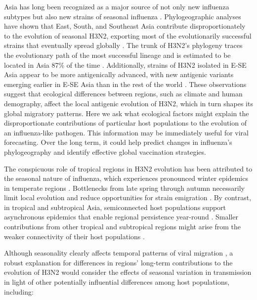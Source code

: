 \documentclass[10pt]{article}
\begin{document}
Asia has long been recognized as a major source of not only new influenza subtypes but also new strains of seasonal influenza \cite{Shortridge:1982wo, Webster:1992wl, Cox:1994ui, Cox:2000gq}. 
Phylogeographic analyses have shown that East, South, and Southeast Asia contribute disproportionately to the evolution of seasonal H3N2, exporting most of the evolutionarily successful strains that eventually spread globally \cite{Rambaut:2008ew,Russell:2008ke,Bahl:2011ep, Bedford:2010el, Bedford:2015fj}. 
The trunk of H3N2's phylogeny traces the evolutionary path of the most successful lineage and is estimated to be located in Asia 87\% of the time \cite{Bedford:2015fj}.
Additionally, strains of H3N2 isolated in E-SE Asia appear to be more antigenically advanced, with new antigenic variants emerging earlier in E-SE Asia than in the rest of the world \cite{Russell:2008ke, Bedford:2014bf}.
These observations suggest that ecological differences between regions, such as climate and human demography, affect the local antigenic evolution of H3N2, which in turn shapes its global migratory patterns.
Here we ask what ecological factors might explain the disproportionate contributions of particular host populations to the evolution of an influenza-like pathogen.
This information may be immediately useful for viral forecasting.  
Over the long term, it could help predict changes in influenza's phylogeography and identify effective global vaccination strategies.

The conspicuous role of tropical regions in H3N2 evolution has been attributed to the seasonal nature of influenza, which experiences pronounced winter epidemics in temperate regions \cite{Webster:1992wl, Viboud:2006ge, Rambaut:2008ew, Russell:2008ke, Bedford:2010el, Bahl:2011ep}.
Bottlenecks from late spring through autumn necessarily limit local evolution and reduce opportunities for strain emigration \cite{Adams:2011dh, Zinder:2014jx}. 
By contrast, in tropical and subtropical Asia, semiconnected host populations support asynchronous epidemics that enable regional persistence year-round \cite{Viboud:2006ge, Russell:2008ke, Cheng:2013hb}. 
Smaller contributions from other tropical and subtropical regions might arise from the weaker connectivity of their host populations \cite{Bedford:2010el, Chan:2010fu, Lemey:2014ez}. 

Although seasonality clearly affects temporal patterns of viral migration \cite{Bahl:2011ep}, a robust explanation for differences in regions' long-term contributions to the evolution of H3N2 would consider the effects of seasonal variation in transmission in light of other potentially influential differences among host populations, including:
\end{document}
